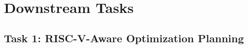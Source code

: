 \documentclass[sigplan,screen,review,anonymous]{acmart}
\providecommand{\DIFdel}[1]{{\protect\color{red} \scriptsize #1}} %
\providecommand{\DIFaddend}{} %
\providecommand{\DIFdelbegin}{} %
\providecommand{\DIFdelend}{} %
\begin{document}





\DIFaddend \section{Downstream Tasks}
\DIFdelbegin \subsection{\DIFdel{Task 1: RISC-V-Aware Optimization Planning}}
\addtocounter{subsection}{-1}%
\DIFdelend 
\end{document}
